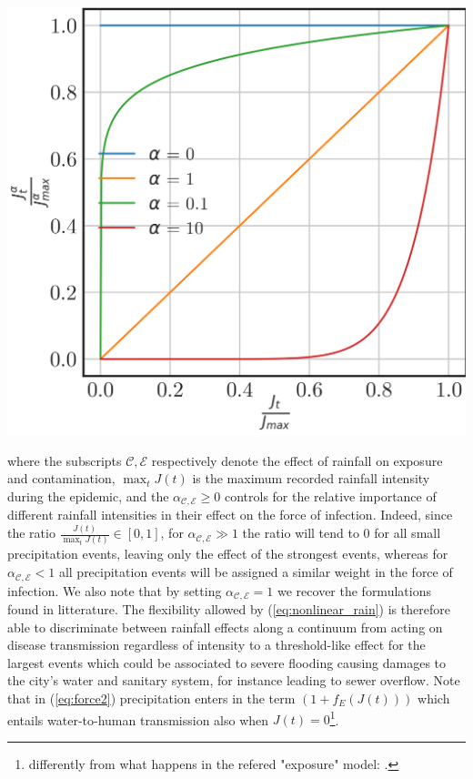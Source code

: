 \begin{marginfigure}
	\centering
	\includegraphics[width=\textwidth]{fig_cholera-rainfall/alpha.png}
	\label{fig:alpha}
\end{marginfigure}
where the subscripts $\mathcal{C,E}$ respectively denote the effect of rainfall on exposure and contamination, $\max_t J(t)$ is the maximum recorded rainfall intensity during the epidemic, and the $\alpha_{\mathcal{C,E}}\ge0$ controls for the relative importance of different rainfall intensities in their effect on the force of infection. Indeed, since the ratio $\frac{J(t)}{\max_t J(t)} \in [0,1]$, for $\alpha_{\mathcal{C,E}} \gg 1$ the ratio will tend to 0 for all small precipitation events, leaving only the effect of the strongest events, whereas for $\alpha_{\mathcal{C,E}} < 1$ all precipitation events will be assigned a similar weight in the force of infection. We also note that by setting $\alpha_{\mathcal{C,E}} = 1$ we recover the formulations found in litterature. The flexibility allowed by (\ref{eq:nonlinear_rain}) is therefore able to discriminate between rainfall effects along a continuum from acting on disease transmission regardless of intensity to a threshold-like effect for the largest events which could be associated to severe flooding causing damages to the city's water and sanitary system, for instance leading to sewer overflow.
Note that in (\ref{eq:force2}) precipitation enters in the term $\left(1+f_E \left(J(t)\right)\right)$ which entails water-to-human transmission also when $J(t)=0$\footnote{differently from what happens in the refered "exposure" model: .}.

